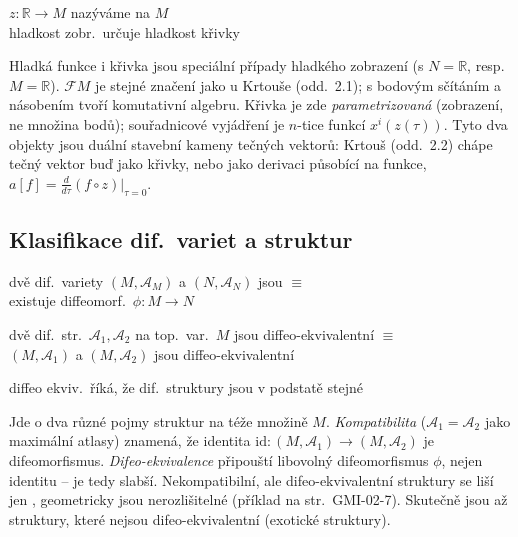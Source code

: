 \begin{definice}
$z: \mathbb{R}\to M$ nazýváme  na $M$ \\
hladkost zobr.\ určuje hladkost křivky
\end{definice}

\begin{vysvetleni}
Hladká funkce i křivka jsou speciální případy hladkého zobrazení (s $N=\mathbb{R}$, resp.\ $M=\mathbb{R}$). $\mathcal{F}M$ je stejné značení jako u Krtouše (odd.~2.1); s bodovým sčítáním a násobením tvoří komutativní algebru. Křivka je zde \emph{parametrizovaná} (zobrazení, ne množina bodů); souřadnicové vyjádření je $n$-tice funkcí $x^i(z(\tau))$. Tyto dva objekty jsou duální stavební kameny tečných vektorů: Krtouš (odd.~2.2) chápe tečný vektor buď jako  křivky, nebo jako derivaci působící na funkce, $a[f] = \frac{d}{d\tau}(f\circ z)|_{\tau=0}$.
\end{vysvetleni}

\subsection{Klasifikace dif.\ variet a struktur}

\begin{definice}
dvě dif.\ variety $(M,\mathcal{A}_M)$ a $(N,\mathcal{A}_N)$ jsou  $\equiv$ \\
\quad existuje diffeomorf.\ $\phi: M\to N$

dvě dif.\ str.\ $\mathcal{A}_1,\mathcal{A}_2$ na top.\ var.\ $M$ jsou diffeo-ekvivalentní $\equiv$ \\
\quad $(M,\mathcal{A}_1)$ a $(M,\mathcal{A}_2)$ jsou diffeo-ekvivalentní
\end{definice}
diffeo ekviv.\ říká, že dif.\ struktury jsou v podstatě stejné

\begin{vysvetleni}
Jde o dva různé pojmy  struktur na téže množině $M$. \emph{Kompatibilita} ($\mathcal{A}_1=\mathcal{A}_2$ jako maximální atlasy) znamená, že identita $\mathrm{id}:(M,\mathcal{A}_1)\to(M,\mathcal{A}_2)$ je difeomorfismus. \emph{Difeo-ekvivalence} připouští libovolný difeomorfismus $\phi$, nejen identitu -- je tedy slabší. Nekompatibilní, ale difeo-ekvivalentní struktury se liší jen , geometricky jsou nerozlišitelné (příklad na str.~GMI-02-7). Skutečně  jsou až struktury, které nejsou difeo-ekvivalentní (exotické struktury).
\end{vysvetleni}

